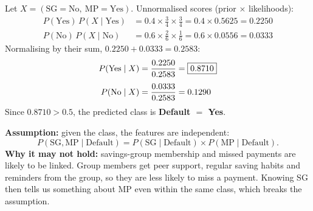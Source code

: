 Let $X = (\text{SG}=\text{No},\ \text{MP}=\text{Yes})$. Unnormalised scores (prior $\times$ likelihoods):
\begin{align*}
P(\text{Yes})\,P(X \mid \text{Yes}) &= 0.4 \times \tfrac{3}{4} \times \tfrac{3}{4} = 0.4 \times 0.5625 = 0.2250\\[2pt]
P(\text{No})\,P(X \mid \text{No})   &= 0.6 \times \tfrac{2}{6} \times \tfrac{1}{6} = 0.6 \times 0.0556 = 0.0333
\end{align*}
Normalising by their sum, $0.2250 + 0.0333 = 0.2583$:
\begin{align*}
P(\text{Yes} \mid X) &= \frac{0.2250}{0.2583} = \boxed{0.8710}\\[4pt]
P(\text{No} \mid X)  &= \frac{0.0333}{0.2583} = 0.1290
\end{align*}
Since $0.8710 > 0.5$, the predicted class is \textbf{Default $=$ Yes}.

\textbf{Assumption:} given the class, the features are independent:
\[
  P(\text{SG}, \text{MP} \mid \text{Default}) = P(\text{SG} \mid \text{Default}) \times P(\text{MP} \mid \text{Default}).
\]
\textbf{Why it may not hold:} savings-group membership and missed payments are likely to be
linked. Group members get peer support, regular saving habits and reminders from the group, so
they are less likely to miss a payment. Knowing SG then tells us something about MP even within
the same class, which breaks the assumption.
